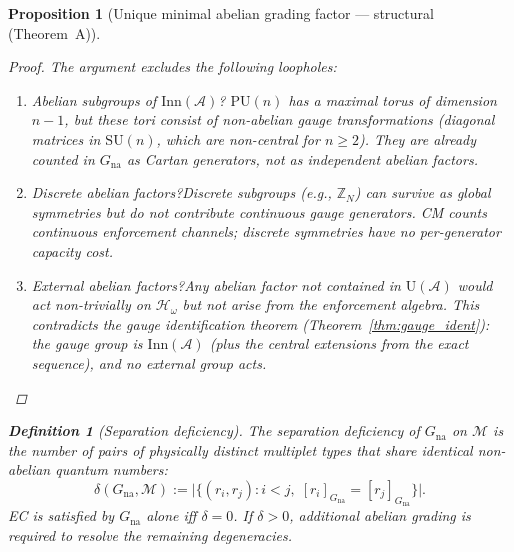 \documentclass[11pt,a4paper]{article}
\newtheorem{proposition}[theorem]{Proposition}
\theoremstyle{definition}
\newtheorem{definition}[theorem]{Definition}
\begin{document}
\begin{proposition}[Unique minimal abelian grading factor ---
structural (Theorem~A)]
\begin{proof}
The argument excludes the following loopholes:
\begin{enumerate}[label=(\alph*),nosep]
  \item \textit{Abelian subgroups of $\mathrm{Inn}(\mathcal{A})$?}\quad
  $\mathrm{PU}(n)$ has a maximal torus of dimension $n - 1$, but these
  tori consist of \emph{non-abelian} gauge transformations (diagonal
  matrices in $\mathrm{SU}(n)$, which are non-central for $n \ge 2$).
  They are already counted in $G_{\mathrm{na}}$ as Cartan generators,
  not as independent abelian factors.
  \item \textit{Discrete abelian factors?}\quad Discrete subgroups
  (e.g., $\mathbb{Z}_N$) can survive as global symmetries but do not
  contribute continuous gauge generators.  CM counts continuous
  enforcement channels; discrete symmetries have no per-generator
  capacity cost.
  \item \textit{External abelian factors?}\quad Any abelian factor not
  contained in $\mathrm{U}(\mathcal{A})$ would act non-trivially on
  $\mathcal{H}_\omega$ but not arise from the enforcement algebra.
  This contradicts the gauge identification theorem
  (Theorem~\ref{thm:gauge_ident}): the gauge group is
  $\mathrm{Inn}(\mathcal{A})$ (plus the central extensions from the
  exact sequence), and no external group acts.
\end{enumerate}
\end{proof}

\begin{definition}[Separation deficiency]\label{def:sep_deficiency}
The \emph{separation deficiency} of $G_{\mathrm{na}}$ on $\mathcal{M}$
is the number of pairs of physically distinct multiplet types that
share identical non-abelian quantum numbers:
\[
  \delta(G_{\mathrm{na}}, \mathcal{M}) := \bigl|\{(r_i, r_j) : i < j,\;
  [r_i]_{G_{\mathrm{na}}} = [r_j]_{G_{\mathrm{na}}}\}\bigr|.
\]
EC is satisfied by $G_{\mathrm{na}}$ alone iff $\delta = 0$.  If
$\delta > 0$, additional abelian grading is required to resolve the
remaining degeneracies.
\end{definition}


\end{proposition}
\end{document}
